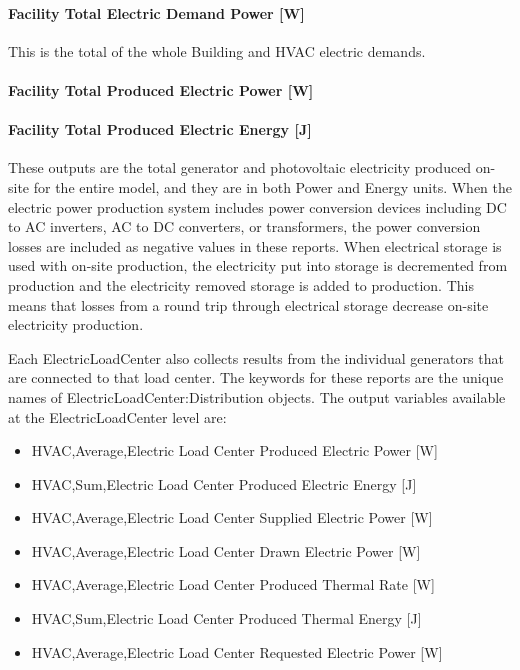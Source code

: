 \paragraph{Facility Total Electric Demand Power {[}W{]}}\label{facility-total-electric-demand-power-w}

This is the total of the whole Building and HVAC electric demands.

\paragraph{Facility Total Produced Electric Power {[}W{]}}\label{facility-total-produced-electric-power-w}

\paragraph{Facility Total Produced Electric Energy {[}J{]}}\label{facility-total-produced-electric-energy-j}

These outputs are the total generator and photovoltaic electricity produced on-site for the entire model, and they are in both Power and Energy units. When the electric power production system includes power conversion devices including DC to AC inverters, AC to DC converters, or transformers, the power conversion losses are included as negative values in these reports. When electrical storage is used with on-site production, the electricity put into storage is decremented from production and the electricity removed storage is added to production. This means that losses from a round trip through electrical storage decrease on-site electricity production.

Each ElectricLoadCenter also collects results from the individual generators that are connected to that load center. The keywords for these reports are the unique names of ElectricLoadCenter:Distribution objects. The output variables available at the ElectricLoadCenter level are:

\begin{itemize}
\tightlist
\item
  HVAC,Average,Electric Load Center Produced Electric Power {[}W{]}
\item
  HVAC,Sum,Electric Load Center Produced Electric Energy {[}J{]}
\item
  HVAC,Average,Electric Load Center Supplied Electric Power {[}W{]}
\item
  HVAC,Average,Electric Load Center Drawn Electric Power {[}W{]}
\item
  HVAC,Average,Electric Load Center Produced Thermal Rate {[}W{]}
\item
  HVAC,Sum,Electric Load Center Produced Thermal Energy {[}J{]}
\item
  HVAC,Average,Electric Load Center Requested Electric Power {[}W{]}
\end{itemize}

